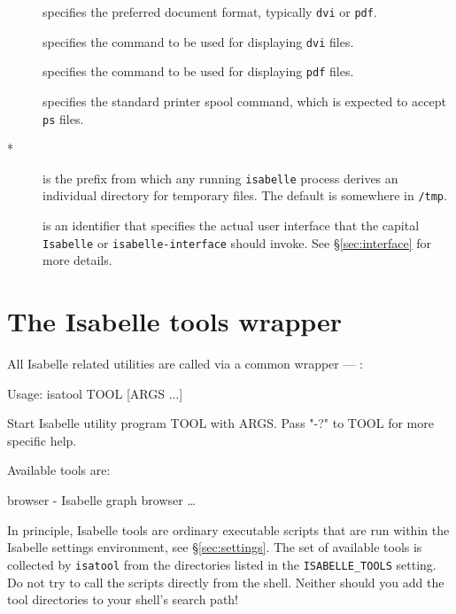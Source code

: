\begin{description}
\item[] specifies the preferred document format,
  typically \texttt{dvi} or \texttt{pdf}.
  
\item[] specifies the command to be used for displaying
  \texttt{dvi} files.
  
\item[] specifies the command to be used for displaying
  \texttt{pdf} files.
  
\item[] specifies the standard printer spool command,
  which is expected to accept \texttt{ps} files.
  
\item[*] is the prefix from which any running
  \texttt{isabelle} process derives an individual directory for temporary
  files.  The default is somewhere in \texttt{/tmp}.
  
\item[] is an identifier that specifies the actual
  user interface that the capital \texttt{Isabelle} or
  \texttt{isabelle-interface} should invoke.  See \S\ref{sec:interface} for
  more details.

\end{description}


\section{The Isabelle tools wrapper} \label{sec:isatool}

All Isabelle related utilities are called via a common wrapper ---
:
\begin{ttbox}
Usage: isatool TOOL [ARGS ...]

  Start Isabelle utility program TOOL with ARGS. Pass "-?" to TOOL
  for more specific help.

  Available tools are:

    browser - Isabelle graph browser
    \dots
\end{ttbox}
In principle, Isabelle tools are ordinary executable scripts that are run
within the Isabelle settings environment, see \S\ref{sec:settings}.  The set
of available tools is collected by \texttt{isatool} from the directories
listed in the \texttt{ISABELLE_TOOLS} setting.  Do not try to call the scripts
directly from the shell.  Neither should you add the tool directories to your
shell's search path!


